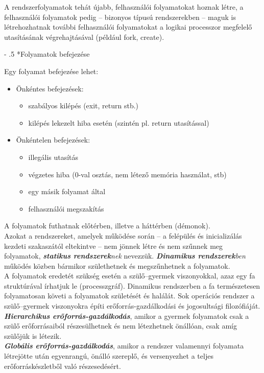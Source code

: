 \documentclass[tikz,12pt,margin=0px]{article}
\makeatletter
\renewcommand\paragraph{%
	\@startsection{paragraph}{4}{0mm}%
	{-\baselineskip}%
	{.5\baselineskip}%
	{\normalfont\normalsize\bfseries}}
\makeatother
\begin{document}
    \noindent A rendszerfolyamatok tehát újabb, felhasználói folyamatokat hoznak létre, a felhasználói folyamatok pedig – bizonyos típusú rendszerekben – maguk is létrehozhatnak további felhasználói folyamatokat a logikai processzor megfelelő utasításának végrehajtásával (például fork, create).

	\paragraph*{Folyamatok befejezése}

    Egy folyamat befejezése lehet:
	\begin{itemize}[topsep=8pt,itemsep=4pt,partopsep=4pt, parsep=4pt]
        \item Önkéntes befejezések:
        \begin{itemize}
            \item szabályos kilépés (exit, return stb.)
            \item kilépés lekezelt hiba esetén (szintén pl. return utasítással)
        \end{itemize}
        \item Önkéntelen befejezések:
        \begin{itemize}
            \item illegális utasítás
            \item végzetes hiba (0-val osztás, nem létező memória használat, stb)
            \item egy másik folyamat által
            \item felhasználói megszakítás
        \end{itemize}
	\end{itemize}

    \noindent A folyamatok futhatnak előtérben, illetve a háttérben (démonok).\\

    \noindent Azokat a rendszereket, amelyek működése során – a felépülés és inicializálás kezdeti szakaszától eltekintve – nem jönnek létre és nem szűnnek meg folyamatok, \emph{\textbf{statikus rendszerek}nek} nevezzük. 
    \emph{\textbf{Dinamikus rendszerek}ben} működés közben bármikor születhetnek és megszűnhetnek a folyamatok.\\

    \noindent A folyamatok eredetét szükség esetén a szülő–gyermek viszonyokkal, azaz egy fa struktúrával írhatjuk le (processzgráf). Dinamikus rendszerben a fa természetesen folyamatosan követi a folyamatok születését és halálát. Sok operációs rendszer a szülő–gyermek viszonyokra építi erőforrás-gazdálkodási és jogosultsági filozófiáját.\\
    \emph{\textbf{Hierarchikus erőforrás-gazdálkodás}}, amikor a gyermek folyamatok csak a szülő erőforrásaiból részesülhetnek és nem létezhetnek önállóan, csak amíg szülőjük is létezik. \\
    \emph{\textbf{Globális erőforrás-gazdálkodás}}, amikor a rendszer valamennyi folyamata létrejötte után egyenrangú, önálló szereplő, és versenyezhet a teljes erőforráskészletből való részesedésért.
\end{document}
